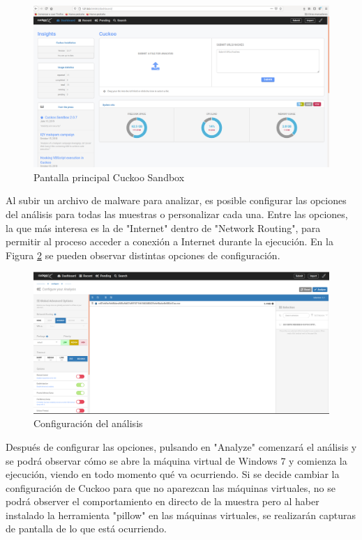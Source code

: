 \begin{figure}[h!]
\begin{center}
\includegraphics[width=0.9\linewidth]{images/principalcuckoo.png}
\end{center}
\caption{Pantalla principal Cuckoo Sandbox}
\label{fig:DashboardCuckoo}
\end{figure}

Al subir un archivo de malware para analizar, es posible configurar las opciones del análisis para todas las muestras o personalizar cada una. Entre las opciones, la que más interesa es la de "Internet" dentro de "Network Routing", para permitir al proceso acceder a conexión a Internet durante la ejecución. En la Figura \ref{fig:confAnalisis} se pueden observar distintas opciones de configuración.

\begin{figure}[h!]
\begin{center}
\includegraphics[width=0.9\linewidth]{images/configuracionanalisis.png}
\end{center}
\caption{Configuración del análisis}
\label{fig:confAnalisis}
\end{figure}

Después de configurar las opciones, pulsando en "Analyze" comenzará el análisis y se podrá observar cómo se abre la máquina virtual de Windows 7 y comienza la ejecución, viendo en todo momento qué va ocurriendo. Si se decide cambiar la configuración de Cuckoo para que no aparezcan las máquinas virtuales, no se podrá observer el comportamiento en directo de la muestra pero al haber instalado la herramienta "pillow" en las máquinas virtuales, se realizarán capturas de pantalla de lo que está ocurriendo.

